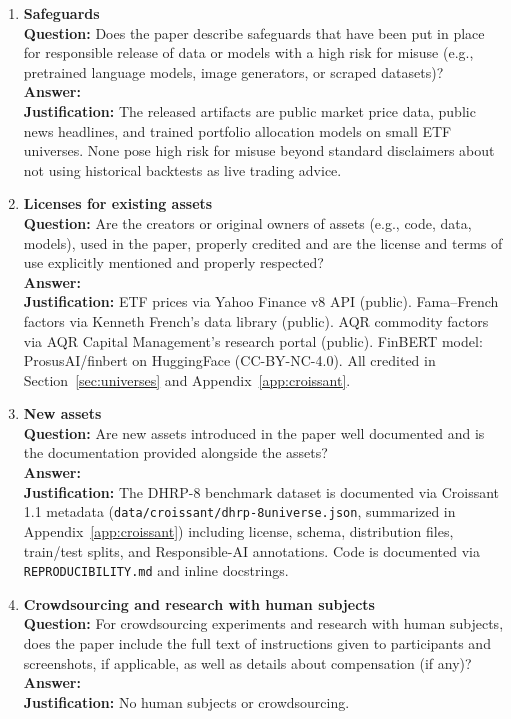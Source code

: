 \begin{enumerate}
\item {\bf Safeguards}\\
\textbf{Question:} Does the paper describe safeguards that have been put in place for responsible release of data or models with a high risk for misuse (e.g., pretrained language models, image generators, or scraped datasets)?\\
\textbf{Answer:} \answerNA{}\\
\textbf{Justification:} The released artifacts are public market price data, public news headlines, and trained portfolio allocation models on small ETF universes. None pose high risk for misuse beyond standard disclaimers about not using historical backtests as live trading advice.

\item {\bf Licenses for existing assets}\\
\textbf{Question:} Are the creators or original owners of assets (e.g., code, data, models), used in the paper, properly credited and are the license and terms of use explicitly mentioned and properly respected?\\
\textbf{Answer:} \answerYes{}\\
\textbf{Justification:} ETF prices via Yahoo Finance v8 API (public). Fama--French factors via Kenneth French's data library (public). AQR commodity factors via AQR Capital Management's research portal (public). FinBERT model: ProsusAI/finbert on HuggingFace (CC-BY-NC-4.0). All credited in Section~\ref{sec:universes} and Appendix~\ref{app:croissant}.

\item {\bf New assets}\\
\textbf{Question:} Are new assets introduced in the paper well documented and is the documentation provided alongside the assets?\\
\textbf{Answer:} \answerYes{}\\
\textbf{Justification:} The DHRP-8 benchmark dataset is documented via Croissant 1.1 metadata (\texttt{data/croissant/dhrp-8universe.json}, summarized in Appendix~\ref{app:croissant}) including license, schema, distribution files, train/test splits, and Responsible-AI annotations. Code is documented via \texttt{REPRODUCIBILITY.md} and inline docstrings.

\item {\bf Crowdsourcing and research with human subjects}\\
\textbf{Question:} For crowdsourcing experiments and research with human subjects, does the paper include the full text of instructions given to participants and screenshots, if applicable, as well as details about compensation (if any)?\\
\textbf{Answer:} \answerNA{}\\
\textbf{Justification:} No human subjects or crowdsourcing.


\end{enumerate}
